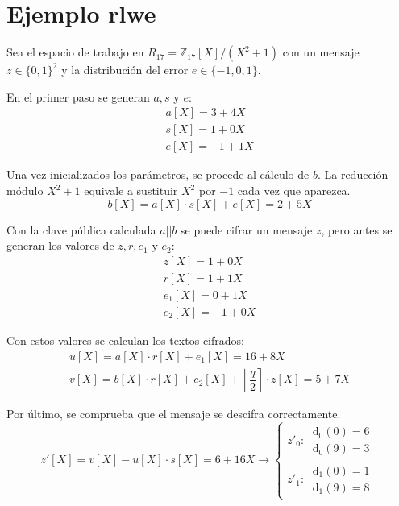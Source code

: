 \chapter{Ejemplo \gls{rlwe}}
\label{chap:ej:rlwe}
Sea el espacio de trabajo en $R_{17}=\mathbb{Z}_{17}[X]/\left(X^2+1\right)$ con un mensaje $z\in \{0,1\}^2$ y la distribución del error $e\in \{-1,0,1\}$.
\newline

En el primer paso se generan $a, s$ y $e$:
\begin{equation}
	\begin{array}{l}
		a[X]=3+4X\\
		s[X]=1+0X\\
		e[X]=-1+1X
	\end{array}
\end{equation}

Una vez inicializados los parámetros, se procede al cálculo de \(b\). La reducción módulo $X^2+1$ equivale a sustituir $X^2$ por $-1$ cada vez que aparezca.
\begin{equation}
	b[X]=a[X]\cdot s[X]+e[X]=2+5X
\end{equation}

Con la clave pública calculada \(a||b\) se puede cifrar un mensaje \(z\), pero antes se generan los valores de \(z, r, e_1\) y \(e_2\):
\begin{equation}
	\begin{array}{l}
		z[X]=1+0X\\
		r[X]=1+1X\\
		e_1[X]=0+1X\\
		e_2[X]=-1+0X
	\end{array}
\end{equation}

Con estos valores se calculan los textos cifrados:
\begin{equation}
	\begin{array}{l}
		u[X]=a[X]\cdot r[X]+e_1[X]=16+8X\\
		v[X]=b[X]\cdot r[X]+e_2[X]+\left\lfloor \dfrac{q}{2} \right\rceil \cdot z[X] =5+7X
	\end{array}
\end{equation}

Por último, se comprueba que el mensaje se descifra correctamente. 
\begin{equation}
	z'[X]=v[X]-u[X]\cdot s[X]=6+16X \rightarrow \left\{ \begin{array}{l}
		z'_0: \ \begin{array}{l}
			\text{d}_0(0) = 6 \\
			\text{d}_0(9) = 3
		\end{array} \\
		z'_1: \ \begin{array}{l}
			\text{d}_1(0) = 1 \\
			\text{d}_1(9) = 8
		\end{array}
	\end{array} \right.
\end{equation}

